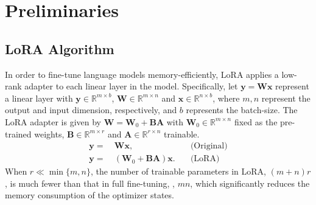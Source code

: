 \section{Preliminaries}\label{sec:preliminaries}


\subsection{LoRA Algorithm}
In order to fine-tune language models memory-efficiently, LoRA applies a low-rank adapter to each linear layer in the model. Specifically, let $\mathbf{y}=\mathbf{W}\mathbf{x}$ represent a linear layer with $\mathbf{y}\in\mathbb{R}^{m\times b}$, $\mathbf{W}\in\mathbb{R}^{m\times n}$ and $\mathbf{x}\in\mathbb{R}^{n\times b}$, where $m,n$ represent the output and input dimension, respectively, and $b$ represents the batch-size. The LoRA adapter is given by $\mathbf{W}=\mathbf{W}_0+\mathbf{B}\mathbf{A}$ with $\mathbf{W}_0\in\mathbb{R}^{m\times n}$ fixed as the pre-trained weights, $\mathbf{B}\in\mathbb{R}^{m\times r}$ and $\mathbf{A}\in\mathbb{R}^{r\times n}$ trainable.
\begin{align*}
    \mathbf{y}=&\ \mathbf{W}\mathbf{x},&\quad\text{(Original)}\\
    \mathbf{y}=&\ (\mathbf{W}_0+\mathbf{B}\mathbf{A})\mathbf{x}.&\quad\text{(LoRA)}
\end{align*}
When $r\ll\min\{m,n\}$, the number of trainable parameters in LoRA, $(m+n)r$, is much fewer than that in full fine-tuning, \ie, $mn$, which significantly reduces the memory consumption of the optimizer states. 

